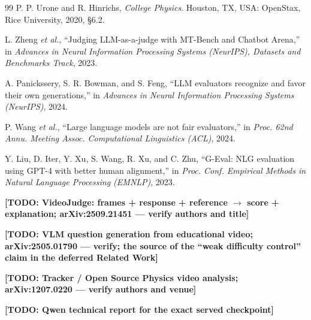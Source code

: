 \documentclass[conference]{IEEEtran}
\newcommand{\todo}[1]{{\color{red}\textbf{[TODO: #1]}}}
\begin{document}
\begin{thebibliography}{99}
 P. P. Urone and R. Hinrichs, \emph{College Physics}.
Houston, TX, USA: OpenStax, Rice University, 2020, \S6.2.

 L. Zheng \emph{et al.}, ``Judging LLM-as-a-judge with
MT-Bench and Chatbot Arena,'' in \emph{Advances in Neural Information
Processing Systems (NeurIPS), Datasets and Benchmarks Track}, 2023.

 A. Panickssery, S. R. Bowman, and S. Feng, ``LLM evaluators
recognize and favor their own generations,'' in \emph{Advances in Neural
Information Processing Systems (NeurIPS)}, 2024.

 P. Wang \emph{et al.}, ``Large language models are not fair
evaluators,'' in \emph{Proc. 62nd Annu. Meeting Assoc. Computational
Linguistics (ACL)}, 2024.

 Y. Liu, D. Iter, Y. Xu, S. Wang, R. Xu, and C. Zhu, ``G-Eval:
NLG evaluation using GPT-4 with better human alignment,'' in \emph{Proc.
Conf. Empirical Methods in Natural Language Processing (EMNLP)}, 2023.

 \todo{VideoJudge: frames + response + reference $\rightarrow$
score + explanation; arXiv:2509.21451 --- verify authors and title}

 \todo{VLM question generation from educational video;
arXiv:2505.01790 --- verify; the source of the ``weak difficulty control''
claim in the deferred Related Work}

 \todo{Tracker / Open Source Physics video analysis;
arXiv:1207.0220 --- verify authors and venue}

 \todo{Qwen technical report for the exact served checkpoint}

\end{thebibliography}
\end{document}
